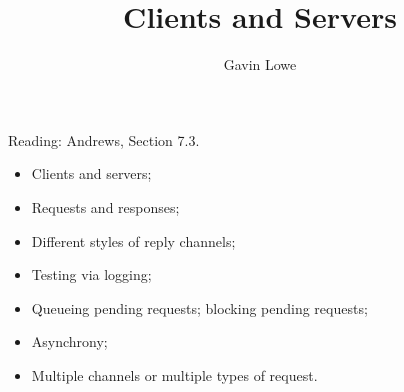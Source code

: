 \documentclass[notes,color]{sepslide0}
\title{Clients and Servers}
\author{Gavin Lowe}
\begin{document}
\begin{slide}
  
  \Title

Reading: Andrews, Section 7.3.

\end{slide}




\begin{slide}

\begin{itemize}
\item
Clients and servers; 

\item
Requests and responses;

\item
Different styles of reply channels;

\item
Testing via logging;

\item Queueing pending requests; blocking pending requests;

\item
Asynchrony; 

\item
Multiple channels or multiple types of request.
\end{itemize}

\end{slide}
\end{document}

